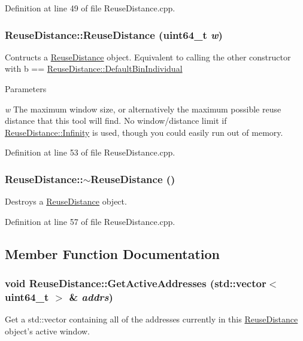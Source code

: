 Definition at line 49 of file ReuseDistance.cpp.\hypertarget{class_reuse_distance_ab68a2d9df5c28571c3f8820c5344b2c1}{
\subsubsection[{ReuseDistance}]{\setlength{\rightskip}{0pt plus 5cm}ReuseDistance::ReuseDistance (uint64\_\-t {\em w})}}
\label{class_reuse_distance_ab68a2d9df5c28571c3f8820c5344b2c1}
Contructs a \hyperlink{class_reuse_distance}{ReuseDistance} object. Equivalent to calling the other constructor with b == \hyperlink{class_reuse_distance_af0d9cba7105109e89ae6b7177f54c976}{ReuseDistance::DefaultBinIndividual}


\begin{DoxyParams}{Parameters}
\item[{\em w}]The maximum window size, or alternatively the maximum possible reuse distance that this tool will find. No window/distance limit if \hyperlink{class_reuse_distance_a59f7f0ac6ad014472537619394ac7375}{ReuseDistance::Infinity} is used, though you could easily run out of memory. \end{DoxyParams}


Definition at line 53 of file ReuseDistance.cpp.\hypertarget{class_reuse_distance_a2846a6f2c045759657b754838045900d}{
\subsubsection[{$\sim$ReuseDistance}]{\setlength{\rightskip}{0pt plus 5cm}ReuseDistance::$\sim$ReuseDistance ()}}
\label{class_reuse_distance_a2846a6f2c045759657b754838045900d}
Destroys a \hyperlink{class_reuse_distance}{ReuseDistance} object. 

Definition at line 57 of file ReuseDistance.cpp.

\subsection{Member Function Documentation}
\hypertarget{class_reuse_distance_acc4885040a8a518fc10b5aa4da7d777a}{
\subsubsection[{GetActiveAddresses}]{\setlength{\rightskip}{0pt plus 5cm}void ReuseDistance::GetActiveAddresses (std::vector$<$ uint64\_\-t $>$ \& {\em addrs})}}
\label{class_reuse_distance_acc4885040a8a518fc10b5aa4da7d777a}
Get a std::vector containing all of the addresses currently in this \hyperlink{class_reuse_distance}{ReuseDistance} object's active window.


